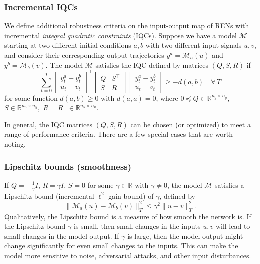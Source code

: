 \subsubsection{Incremental IQCs}

We define additional robustness criteria on the input-output map of RENs with incremental \textit{integral quadratic constraints} (IQCs). Suppose we have a model $\mathcal{M}$ starting at two different initial conditions $a,b$ with two different input signals $u, v$, and consider their corresponding output trajectories $y^a = \mathcal{M}_a(u)$ and $y^b = \mathcal{M}_b(v).$ The model $\mathcal{M}$ satisfies the IQC defined by matrices $(Q, S, R)$ if
\begin{equation}
    \sum_{t=0}^T
    \begin{bmatrix}
        y^a_t - y^b_t \\ u_t - v_t
    \end{bmatrix}^\top
    \begin{bmatrix}
        Q & S^\top \\ S & R
    \end{bmatrix}
    \begin{bmatrix}
        y^a_t - y^b_t \\ u_t - v_t
    \end{bmatrix} 
    \ge -d(a,b)
    \quad \forall \, T
\end{equation}
for some function $d(a,b) \ge 0$ with $d(a,a) = 0$, where $0 \preceq Q \in \mathbb{R}^{n_y\times n_y}$, $S\in\mathbb{R}^{n_u\times n_y},$ $R=R^\top \in \mathbb{R}^{n_u\times n_u}.$ 

In general, the IQC matrices $(Q,S,R)$ can be chosen (or optimized) to meet a range of performance criteria. There are a few special cases that are worth noting.

\subsubsection{Lipschitz bounds (smoothness)} \label{sec:robustness-lipschitz}
If $Q = -\frac{1}{\gamma}I$, $R = \gamma I$, $S = 0$ for some $\gamma \in \mathbb{R}$ with $\gamma \ne 0$, the model $\mathcal{M}$ satisfies a Lipschitz bound (incremental $\ell^2$-gain bound) of $\gamma$, defined by
\begin{equation}
\|\mathcal{M}_a(u) - \mathcal{M}_b(v)\|_T^2 \le \gamma^2 \|u - v\|_T^2.
\end{equation}
Qualitatively, the Lipschitz bound is a measure of how smooth the network is. If the Lipschitz bound $\gamma$ is small, then small changes in the inputs $u,v$ will lead to small changes in the model output. If $\gamma$ is large, then the model output might change significantly for even small changes to the inputs. This can make the model more sensitive to noise, adversarial attacks, and other input disturbances.

